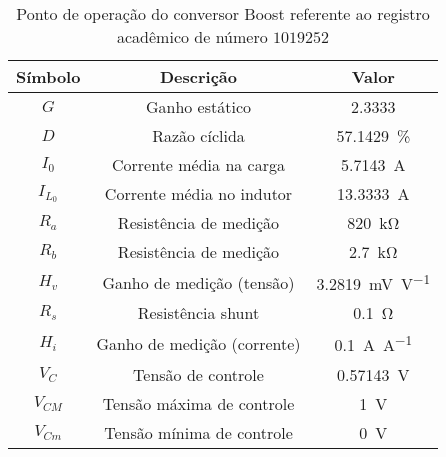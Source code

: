 \begin{table}[!ht]
\centering
\caption{Ponto de operação do conversor Boost referente ao registro acadêmico de número $1019252$}
\label{tab:steadystate}
\begin{tabular}{@{}ccc@{}}
\toprule
\textbf{Símbolo} & \textbf{Descrição} & \textbf{Valor}\\ \midrule
$G$ & Ganho estático & \SI{2.3333}{}\\
$D$ & Razão cíclida  & \SI{57.1429}{\%}\\
$I_0$ & Corrente média na carga  & \SI{5.7143}{\A} \\
$I_{L_0}$ & Corrente média no indutor & \SI{13.3333}{\A} \\
$R_a$ & Resistência de medição & \SI{820}{\kilo\ohm} \\
$R_b$ & Resistência de medição & \SI{2.7}{\kilo\ohm} \\
$H_v$ & Ganho de medição (tensão) & \SI{3.2819}{\milli\V\per\V} \\
$R_s$ & Resistência shunt & \SI{0.1}{\ohm} \\
$H_i$ & Ganho de medição (corrente) & \SI{0.1}{\A\per\A} \\
$V_C$ & Tensão de controle  & \SI{0.57143}{\V} \\
$V_{CM}$ & Tensão máxima de controle  & \SI{1}{\V} \\
$V_{Cm}$ & Tensão mínima de controle  & \SI{0}{\V} \\
\bottomrule
\end{tabular}
\end{table}

